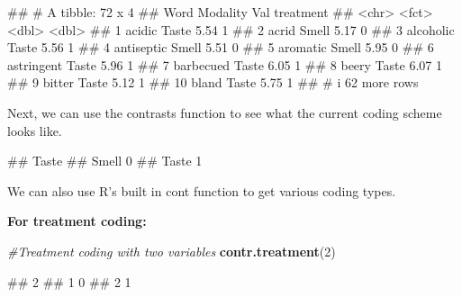 \documentclass[
]{book}
\newenvironment{Shaded}{\begin{snugshade}}{\end{snugshade}}
\newcommand{\CommentTok}[1]{\textcolor[rgb]{0.56,0.35,0.01}{\textit{#1}}}
\newcommand{\DecValTok}[1]{\textcolor[rgb]{0.00,0.00,0.81}{#1}}
\newcommand{\FunctionTok}[1]{\textcolor[rgb]{0.13,0.29,0.53}{\textbf{#1}}}
\newcommand{\NormalTok}[1]{#1}
\newcommand{\SpecialCharTok}[1]{\textcolor[rgb]{0.81,0.36,0.00}{\textbf{#1}}}
\begin{document}
\begin{Shaded}
\begin{Highlighting}[]
\NormalTok{\#\# \# A tibble: 72 x 4}
\NormalTok{\#\#    Word       Modality   Val treatment}
\NormalTok{\#\#    \textless{}chr\textgreater{}      \textless{}fct\textgreater{}    \textless{}dbl\textgreater{}     \textless{}dbl\textgreater{}}
\NormalTok{\#\#  1 acidic     Taste     5.54         1}
\NormalTok{\#\#  2 acrid      Smell     5.17         0}
\NormalTok{\#\#  3 alcoholic  Taste     5.56         1}
\NormalTok{\#\#  4 antiseptic Smell     5.51         0}
\NormalTok{\#\#  5 aromatic   Smell     5.95         0}
\NormalTok{\#\#  6 astringent Taste     5.96         1}
\NormalTok{\#\#  7 barbecued  Taste     6.05         1}
\NormalTok{\#\#  8 beery      Taste     6.07         1}
\NormalTok{\#\#  9 bitter     Taste     5.12         1}
\NormalTok{\#\# 10 bland      Taste     5.75         1}
\NormalTok{\#\# \# i 62 more rows}
\end{Highlighting}
\end{Shaded}

Next, we can use the contrasts function to see what the current coding scheme looks like.

\begin{Shaded}
\end{Shaded}

\begin{Shaded}
\begin{Highlighting}[]
\NormalTok{\#\#       Taste}
\NormalTok{\#\# Smell     0}
\NormalTok{\#\# Taste     1}
\end{Highlighting}
\end{Shaded}

We can also use R's built in cont function to get various coding types.

\textbf{For treatment coding:}

\begin{Shaded}
\begin{Highlighting}[]
\CommentTok{\#Treatment coding with two variables}
\FunctionTok{contr.treatment}\NormalTok{(}\DecValTok{2}\NormalTok{)}
\end{Highlighting}
\end{Shaded}

\begin{Shaded}
\begin{Highlighting}[]
\NormalTok{\#\#   2}
\NormalTok{\#\# 1 0}
\NormalTok{\#\# 2 1}
\end{Highlighting}
\end{Shaded}
\end{document}

